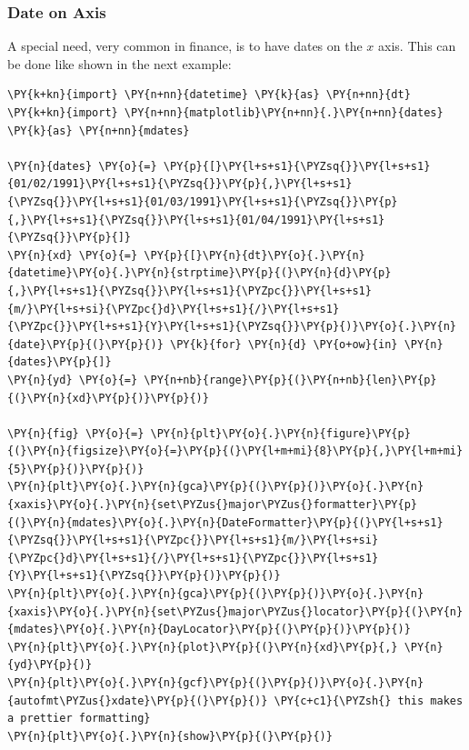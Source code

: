 \subsubsection{Date on Axis}\label{date-on-axis}

A special need, very common in finance, is to have dates on the \(x\)
axis. This can be done like shown in the next example:

\begin{tcolorbox}[breakable, size=fbox, boxrule=1pt, pad at break*=1mm,colback=cellbackground, colframe=cellborder]
\begin{Verbatim}[commandchars=\\\{\}]
\PY{k+kn}{import} \PY{n+nn}{datetime} \PY{k}{as} \PY{n+nn}{dt}
\PY{k+kn}{import} \PY{n+nn}{matplotlib}\PY{n+nn}{.}\PY{n+nn}{dates} \PY{k}{as} \PY{n+nn}{mdates}
	
\PY{n}{dates} \PY{o}{=} \PY{p}{[}\PY{l+s+s1}{\PYZsq{}}\PY{l+s+s1}{01/02/1991}\PY{l+s+s1}{\PYZsq{}}\PY{p}{,}\PY{l+s+s1}{\PYZsq{}}\PY{l+s+s1}{01/03/1991}\PY{l+s+s1}{\PYZsq{}}\PY{p}{,}\PY{l+s+s1}{\PYZsq{}}\PY{l+s+s1}{01/04/1991}\PY{l+s+s1}{\PYZsq{}}\PY{p}{]}
\PY{n}{xd} \PY{o}{=} \PY{p}{[}\PY{n}{dt}\PY{o}{.}\PY{n}{datetime}\PY{o}{.}\PY{n}{strptime}\PY{p}{(}\PY{n}{d}\PY{p}{,}\PY{l+s+s1}{\PYZsq{}}\PY{l+s+s1}{\PYZpc{}}\PY{l+s+s1}{m/}\PY{l+s+si}{\PYZpc{}d}\PY{l+s+s1}{/}\PY{l+s+s1}{\PYZpc{}}\PY{l+s+s1}{Y}\PY{l+s+s1}{\PYZsq{}}\PY{p}{)}\PY{o}{.}\PY{n}{date}\PY{p}{(}\PY{p}{)} \PY{k}{for} \PY{n}{d} \PY{o+ow}{in} \PY{n}{dates}\PY{p}{]}
\PY{n}{yd} \PY{o}{=} \PY{n+nb}{range}\PY{p}{(}\PY{n+nb}{len}\PY{p}{(}\PY{n}{xd}\PY{p}{)}\PY{p}{)}
	
\PY{n}{fig} \PY{o}{=} \PY{n}{plt}\PY{o}{.}\PY{n}{figure}\PY{p}{(}\PY{n}{figsize}\PY{o}{=}\PY{p}{(}\PY{l+m+mi}{8}\PY{p}{,}\PY{l+m+mi}{5}\PY{p}{)}\PY{p}{)}
\PY{n}{plt}\PY{o}{.}\PY{n}{gca}\PY{p}{(}\PY{p}{)}\PY{o}{.}\PY{n}{xaxis}\PY{o}{.}\PY{n}{set\PYZus{}major\PYZus{}formatter}\PY{p}{(}\PY{n}{mdates}\PY{o}{.}\PY{n}{DateFormatter}\PY{p}{(}\PY{l+s+s1}{\PYZsq{}}\PY{l+s+s1}{\PYZpc{}}\PY{l+s+s1}{m/}\PY{l+s+si}{\PYZpc{}d}\PY{l+s+s1}{/}\PY{l+s+s1}{\PYZpc{}}\PY{l+s+s1}{Y}\PY{l+s+s1}{\PYZsq{}}\PY{p}{)}\PY{p}{)}
\PY{n}{plt}\PY{o}{.}\PY{n}{gca}\PY{p}{(}\PY{p}{)}\PY{o}{.}\PY{n}{xaxis}\PY{o}{.}\PY{n}{set\PYZus{}major\PYZus{}locator}\PY{p}{(}\PY{n}{mdates}\PY{o}{.}\PY{n}{DayLocator}\PY{p}{(}\PY{p}{)}\PY{p}{)}
\PY{n}{plt}\PY{o}{.}\PY{n}{plot}\PY{p}{(}\PY{n}{xd}\PY{p}{,} \PY{n}{yd}\PY{p}{)}
\PY{n}{plt}\PY{o}{.}\PY{n}{gcf}\PY{p}{(}\PY{p}{)}\PY{o}{.}\PY{n}{autofmt\PYZus{}xdate}\PY{p}{(}\PY{p}{)} \PY{c+c1}{\PYZsh{} this makes a prettier formatting}
\PY{n}{plt}\PY{o}{.}\PY{n}{show}\PY{p}{(}\PY{p}{)}
\end{Verbatim}
\end{tcolorbox}

